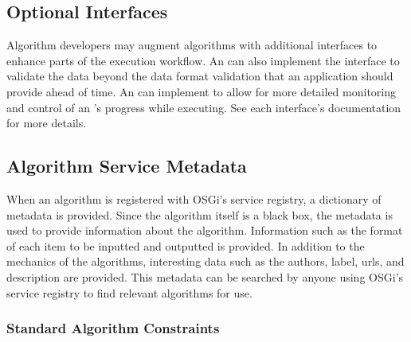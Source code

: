 \subsection{Optional Interfaces}

Algorithm developers may augment algorithms with additional interfaces to enhance
parts of the execution workflow. An  can also implement
the  interface to validate the data beyond the data format
validation that an application should provide ahead of time. An 
can implement  to allow for more detailed monitoring and
control of an 's progress while executing. See each interface's
documentation for more details.

\subsection{Algorithm Service Metadata}
\label{algMetaData}

When an algorithm is registered with OSGi's service registry, a dictionary of
metadata is provided. Since the algorithm itself is a black box, the metadata is
used to provide information about the algorithm. Information such as the format
of each  item to be inputted and outputted is provided. In addition to the
mechanics of the algorithms, interesting data such as the authors, label, urls,
and description are provided. This metadata can be searched by anyone using
OSGi's service registry to find relevant algorithms for use.


\subsubsection{Standard Algorithm Constraints}
\label{algConstraints}


